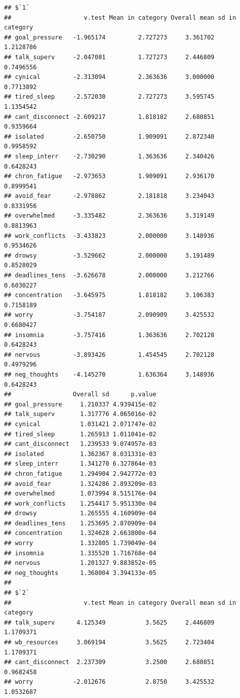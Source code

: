 \documentclass[
]{article}
\begin{document}
\begin{verbatim}
## $`1`
##                    v.test Mean in category Overall mean sd in category
## goal_pressure   -1.965174         2.727273     3.361702      1.2128786
## talk_superv     -2.047081         1.727273     2.446809      0.7496556
## cynical         -2.313094         2.363636     3.000000      0.7713892
## tired_sleep     -2.572030         2.727273     3.595745      1.1354542
## cant_disconnect -2.609217         1.818182     2.680851      0.9359664
## isolated        -2.650750         1.909091     2.872340      0.9958592
## sleep_interr    -2.730290         1.363636     2.340426      0.6428243
## chron_fatigue   -2.973653         1.909091     2.936170      0.8999541
## avoid_fear      -2.978862         2.181818     3.234043      0.8331956
## overwhelmed     -3.335482         2.363636     3.319149      0.8813963
## work_conflicts  -3.433823         2.000000     3.148936      0.9534626
## drowsy          -3.529662         2.000000     3.191489      0.8528029
## deadlines_tens  -3.626678         2.000000     3.212766      0.6030227
## concentration   -3.645975         1.818182     3.106383      0.7158189
## worry           -3.754187         2.090909     3.425532      0.6680427
## insomnia        -3.757416         1.363636     2.702128      0.6428243
## nervous         -3.893426         1.454545     2.702128      0.4979296
## neg_thoughts    -4.145270         1.636364     3.148936      0.6428243
##                 Overall sd      p.value
## goal_pressure     1.210337 4.939415e-02
## talk_superv       1.317776 4.065016e-02
## cynical           1.031421 2.071747e-02
## tired_sleep       1.265913 1.011041e-02
## cant_disconnect   1.239533 9.074957e-03
## isolated          1.362367 8.031331e-03
## sleep_interr      1.341270 6.327864e-03
## chron_fatigue     1.294904 2.942772e-03
## avoid_fear        1.324286 2.893209e-03
## overwhelmed       1.073994 8.515176e-04
## work_conflicts    1.254417 5.951330e-04
## drowsy            1.265555 4.160909e-04
## deadlines_tens    1.253695 2.870909e-04
## concentration     1.324628 2.663800e-04
## worry             1.332805 1.739049e-04
## insomnia          1.335520 1.716768e-04
## nervous           1.201327 9.883852e-05
## neg_thoughts      1.368004 3.394133e-05
## 
## $`2`
##                    v.test Mean in category Overall mean sd in category
## talk_superv      4.125349           3.5625     2.446809      1.1709371
## wb_resources     3.069194           3.5625     2.723404      1.1709371
## cant_disconnect  2.237309           3.2500     2.680851      0.9682458
## worry           -2.012676           2.8750     3.425532      1.0532687

\end{verbatim}
\end{document}
